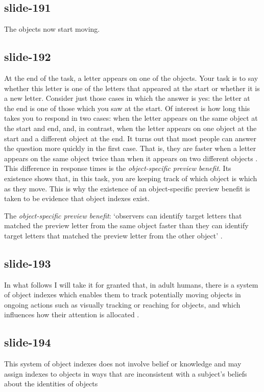 \documentclass[12pt,\papersize]{extarticle}
\begin{document}
\subsection{slide-191}
The objects now start moving.

\subsection{slide-192}
At the end of the task, a letter appears on one of the objects.
Your task is to say whether this letter is one of the letters that appeared at the start or whether it is a new letter.
Consider just those cases in which the answer is yes: the letter at the end is one of those which you saw at the start.
Of interest is how long this takes you to respond in two cases: when the letter appears on the same object at the start and end, and, in contrast, when the letter appears on one object at the start and a different object at the end.
It turns out that most people can answer the question more quickly in the first case.
That is, they are faster when a letter appears on the same object twice than when it appears on two different objects
\citep{Kahneman:1992xt}.
This difference in response times is the
\emph{object-specific preview benefit}.
Its existence shows that, in this task, you are keeping track of which object is which as they move.
This is why the existence of an object-specific preview benefit is taken to be evidence that object indexes exist.

The \emph{object-specific preview benefit}: ‘observers can identify target
letters that matched the preview letter from the same object faster than
they can identify target letters that matched the preview letter from the
other object’ \citep[p.\ 2]{Krushke:1996ge}.

\subsection{slide-193}
In what follows I will take it for granted that, in adult humans,
there is a system of object indexes which enables them to track
potentially moving objects in ongoing actions such as visually tracking or
reaching for objects, and which influences how their attention is allocated
\citep{flombaum:2008_attentional}.

\subsection{slide-194}
This system of object indexes
does not involve belief or knowledge
and may assign indexes to objects in ways that are inconsistent with
a subject’s beliefs about the identities of objects
\citep[e.g.][]{Mitroff:2004pc, mitroff:2007_space}
\end{document}
